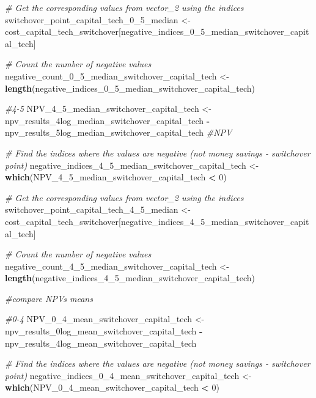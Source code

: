\documentclass[
]{article}
\newenvironment{Shaded}{\begin{snugshade}}{\end{snugshade}}
\newcommand{\CommentTok}[1]{\textcolor[rgb]{0.56,0.35,0.01}{\textit{#1}}}
\newcommand{\DecValTok}[1]{\textcolor[rgb]{0.00,0.00,0.81}{#1}}
\newcommand{\FunctionTok}[1]{\textcolor[rgb]{0.13,0.29,0.53}{\textbf{#1}}}
\newcommand{\NormalTok}[1]{#1}
\newcommand{\OtherTok}[1]{\textcolor[rgb]{0.56,0.35,0.01}{#1}}
\newcommand{\SpecialCharTok}[1]{\textcolor[rgb]{0.81,0.36,0.00}{\textbf{#1}}}
\begin{document}
\begin{Shaded}
\begin{Highlighting}[]
\CommentTok{\# Get the corresponding values from vector\_2 using the indices}
\NormalTok{switchover\_point\_capital\_tech\_0\_5\_median }\OtherTok{\textless{}{-}}\NormalTok{ cost\_capital\_tech\_switchover[negative\_indices\_0\_5\_median\_switchover\_capital\_tech]}

\CommentTok{\# Count the number of negative values}
\NormalTok{negative\_count\_0\_5\_median\_switchover\_capital\_tech }\OtherTok{\textless{}{-}} \FunctionTok{length}\NormalTok{(negative\_indices\_0\_5\_median\_switchover\_capital\_tech)}


\CommentTok{\#4{-}5}
\NormalTok{NPV\_4\_5\_median\_switchover\_capital\_tech }\OtherTok{\textless{}{-}}\NormalTok{ npv\_results\_4log\_median\_switchover\_capital\_tech }\SpecialCharTok{{-}}\NormalTok{ npv\_results\_5log\_median\_switchover\_capital\_tech }\CommentTok{\#NPV}

\CommentTok{\# Find the indices where the values are negative (not money savings {-} switchover point)}
\NormalTok{negative\_indices\_4\_5\_median\_switchover\_capital\_tech }\OtherTok{\textless{}{-}} \FunctionTok{which}\NormalTok{(NPV\_4\_5\_median\_switchover\_capital\_tech }\SpecialCharTok{\textless{}} \DecValTok{0}\NormalTok{)}

\CommentTok{\# Get the corresponding values from vector\_2 using the indices}
\NormalTok{switchover\_point\_capital\_tech\_4\_5\_median }\OtherTok{\textless{}{-}}\NormalTok{ cost\_capital\_tech\_switchover[negative\_indices\_4\_5\_median\_switchover\_capital\_tech]}

\CommentTok{\# Count the number of negative values}
\NormalTok{negative\_count\_4\_5\_median\_switchover\_capital\_tech }\OtherTok{\textless{}{-}} \FunctionTok{length}\NormalTok{(negative\_indices\_4\_5\_median\_switchover\_capital\_tech)}


\CommentTok{\#compare NPVs means}

\CommentTok{\#0{-}4}
\NormalTok{NPV\_0\_4\_mean\_switchover\_capital\_tech }\OtherTok{\textless{}{-}}\NormalTok{ npv\_results\_0log\_mean\_switchover\_capital\_tech }\SpecialCharTok{{-}}\NormalTok{ npv\_results\_4log\_mean\_switchover\_capital\_tech}

\CommentTok{\# Find the indices where the values are negative (not money savings {-} switchover point)}
\NormalTok{negative\_indices\_0\_4\_mean\_switchover\_capital\_tech }\OtherTok{\textless{}{-}} \FunctionTok{which}\NormalTok{(NPV\_0\_4\_mean\_switchover\_capital\_tech }\SpecialCharTok{\textless{}} \DecValTok{0}\NormalTok{)}


\end{Highlighting}
\end{Shaded}
\end{document}
